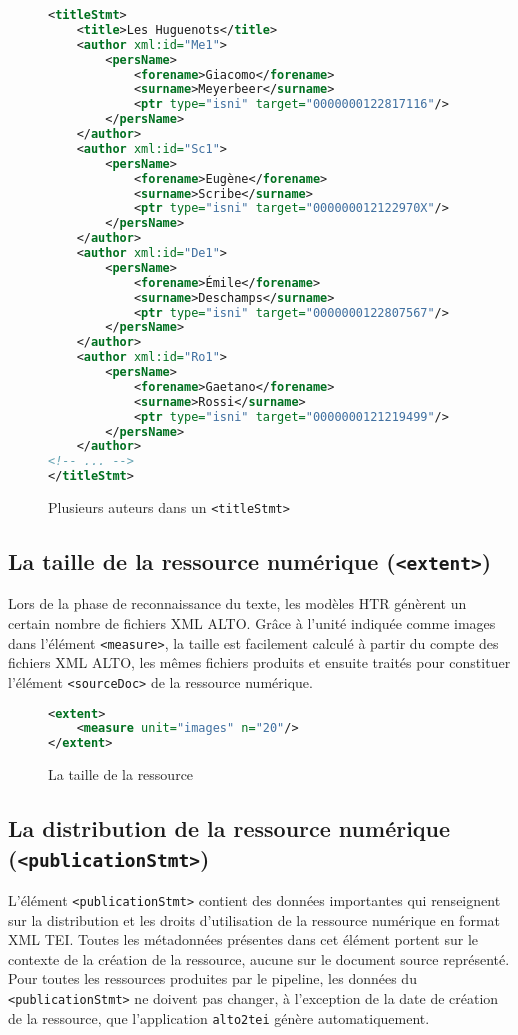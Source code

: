 \documentclass[class=article, crop=false]{standalone}
\begin{document}
\begin{figure}[ht]
\centering
\begin{lstlisting}[language=XML]
<titleStmt>
	<title>Les Huguenots</title>
	<author xml:id="Me1">
		<persName>
			<forename>Giacomo</forename>
			<surname>Meyerbeer</surname>
			<ptr type="isni" target="0000000122817116"/>
		</persName>
	</author>
	<author xml:id="Sc1">
		<persName>
			<forename>Eugène</forename>
			<surname>Scribe</surname>
			<ptr type="isni" target="000000012122970X"/>
		</persName>
	</author>
	<author xml:id="De1">
		<persName>
			<forename>Émile</forename>
			<surname>Deschamps</surname>
			<ptr type="isni" target="0000000122807567"/>
		</persName>
	</author>
	<author xml:id="Ro1">
		<persName>
			<forename>Gaetano</forename>
			<surname>Rossi</surname>
			<ptr type="isni" target="0000000121219499"/>
		</persName>
	</author>
<!-- ... -->
</titleStmt>
\end{lstlisting}
\caption{Plusieurs auteurs dans un \texttt{<titleStmt>}}
\label{fig:multipleauthors}
\end{figure}


\subsection{La taille de la ressource numérique (\texttt{<extent>})}
Lors de la phase de reconnaissance du texte, les modèles \acrshort{HTR} génèrent un certain nombre de fichiers \acrshort{XML} \acrshort{ALTO}. Grâce à l'unité indiquée comme \og{}images\fg{} dans l'élément \texttt{<measure>}, la taille est facilement calculé à partir du compte des fichiers \acrshort{XML} \acrshort{ALTO}, les mêmes fichiers produits et ensuite traités pour constituer l'élément \texttt{<sourceDoc>} de la ressource numérique. 
\begin{figure}[htp]
\centering
\begin{lstlisting}[language=XML]
<extent>
	<measure unit="images" n="20"/>
</extent>
\end{lstlisting}
\caption{La taille de la ressource}
\label{fig:extent}
\end{figure}

\subsection{La distribution de la ressource numérique (\texttt{<publicationStmt>})}
L'élément \texttt{<publicationStmt>} contient des données importantes qui renseignent sur la distribution et les droits d'utilisation de la ressource numérique en format \acrshort{XML} \acrshort{TEI}. Toutes les métadonnées présentes dans cet élément  portent sur le contexte de la création de la ressource, aucune sur le document source représenté. Pour toutes les ressources produites par le pipeline, les données du \texttt{<publicationStmt>} ne doivent pas changer, à l'exception de la date de création de la ressource, que l'application \texttt{alto2tei} génère automatiquement.
\end{document}
